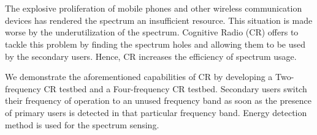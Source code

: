 \chapter*{}
The explosive proliferation of mobile phones and other wireless communication
devices has rendered the spectrum an insufficient resource. This situation is
made worse by the underutilization of the spectrum. Cognitive Radio (CR)
offers to tackle this problem by finding the spectrum holes and allowing them
to be used by the secondary users. Hence, CR increases the efficiency of
spectrum usage.

We demonstrate the aforementioned capabilities of CR by developing a
Two-frequency CR testbed and a Four-frequency CR testbed. Secondary users
switch their frequency of operation to an unused frequency band as soon as the
presence of primary users is detected in that particular frequency band.
Energy detection method is used for the spectrum sensing.